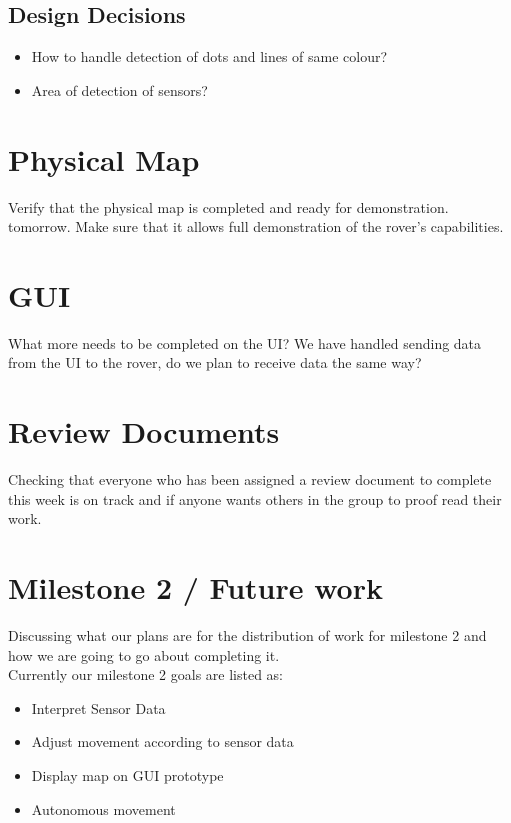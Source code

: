 \documentclass[11pt, a4paper]{article}
\begin{document}
  \subsection{Design Decisions}
  \begin{itemize}
 	 \item{How to handle detection of dots and lines of same colour?}
 	 \item{Area of detection of sensors?}
  \end{itemize}

  \section{ Physical Map }
  Verify that the physical map is completed and ready for demonstration. tomorrow. Make sure that it allows full demonstration of the rover's capabilities. 
  
  \section{GUI}
  What more needs to be completed on the UI? We have handled sending data from the UI to the rover, do we plan to receive data the same way? 
  
  \section{ Review Documents }
  Checking that everyone who has been assigned a review document to complete this week is on track and if anyone wants others in the group to proof read their work. 


  \section{Milestone 2 / Future work}
  Discussing what our plans are for the distribution of work for milestone 2 and how we are going to go about completing it. 
  \\Currently our milestone 2 goals are listed as:
  \begin{itemize}
  	\item {Interpret Sensor Data}
  	\item {Adjust movement according to sensor data}
  	\item {Display map on GUI prototype}
  	\item {Autonomous movement}
  \end{itemize}
  
\end{document}
